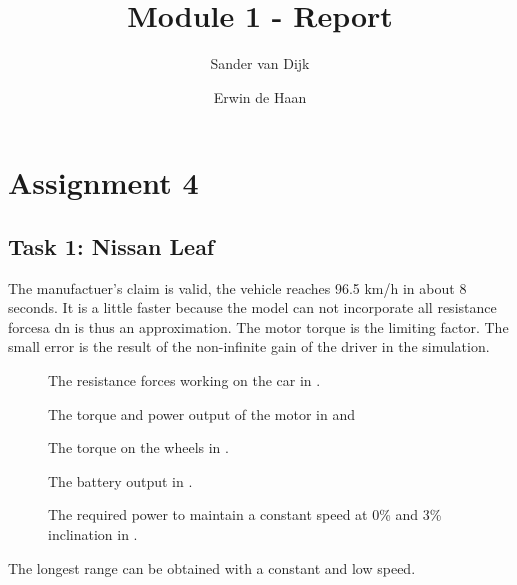 \documentclass[final]{scrreprt} %
\title{Module 1 - Report}
\author{Sander {van Dijk} \and Erwin {de Haan}}
\begin{document}
\chapter{Assignment 4}
\section{Task 1: Nissan Leaf}
The manufactuer's claim is valid, the vehicle reaches 96.5 km/h in about 8 seconds.
It is a little faster because the model can not incorporate all resistance forcesa dn is thus an approximation.
The motor torque is the limiting factor.
The small error is the result of the non-infinite gain of the driver in the simulation.
\begin{figure}[H]
	\centering
    	\setlength\figureheight{4cm}
    	\setlength{}
    	
    	\label{fig:resistance-forces}
    	\caption{The resistance forces working on the car in \newton.}
\end{figure}
\begin{figure}[H]
	\centering
    	\setlength\figureheight{4cm}
    	\setlength{}
    	
    	\label{fig:motor-torque-power}
    	\caption{The torque and power output of the motor in \newton\meter and \watt}
\end{figure}
\begin{figure}[H]
	\centering
    	\setlength\figureheight{4cm}
    	\setlength{}
    	
    	\label{fig:wheel-torque}
    	\caption{The torque on the wheels in \newton\meter.}
\end{figure}
\begin{figure}[H]
	\centering
    	\setlength\figureheight{4cm}
    	\setlength{}
    	
    	\label{fig:battery-output}
    	\caption{The battery output in \watt.}
\end{figure}

\begin{figure}[H]
	\centering
    	\setlength\figureheight{4cm}
    	\setlength{}
    	
    	\label{fig:power-req}
    	\caption{The required power to maintain a constant speed at 0\% and 3\% inclination in \watt.}
\end{figure}
The longest range can be obtained with a constant and low speed.
\end{document}
